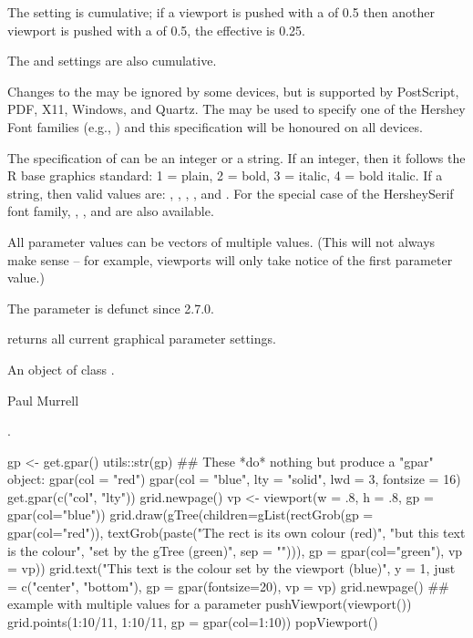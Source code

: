 \begin{Details}
The  setting is cumulative;  if a viewport is pushed
with a  of 0.5 then another viewport is pushed with a
 of 0.5, the effective  is 0.25.

The  and  settings are also cumulative.

Changes to the  may be ignored by some devices,
but is supported by PostScript, PDF, X11, Windows, and Quartz.  The
 may be used to specify one
of the Hershey Font families (e.g., )
and this specification will be honoured
on all devices.

The specification of  can be an integer or a string.
If an integer, then it
follows the R base graphics
standard:  1 = plain, 2 = bold, 3 = italic, 4 = bold italic.
If a string, then valid values are: ,
, , , and
.
For the special case of the HersheySerif font family,
, , and 
are also available.

All parameter values can be vectors of multiple values.  (This will
not always make sense -- for example, viewports will only take
notice of the first parameter value.)

The  parameter is defunct since \R{} 2.7.0.

 returns all current graphical parameter settings.
\end{Details}
%
\begin{Value}
An object of class .
\end{Value}
%
\begin{Author}\relax
Paul Murrell
\end{Author}
%
\begin{SeeAlso}\relax
{}.
\end{SeeAlso}
%
\begin{Examples}
\begin{ExampleCode}
gp <- get.gpar()
utils::str(gp)
## These *do* nothing but produce a "gpar" object:
gpar(col = "red")
gpar(col = "blue", lty = "solid", lwd = 3, fontsize = 16)
get.gpar(c("col", "lty"))
grid.newpage()
vp <- viewport(w = .8, h = .8, gp = gpar(col="blue"))
grid.draw(gTree(children=gList(rectGrob(gp = gpar(col="red")),
                     textGrob(paste("The rect is its own colour (red)",
                                    "but this text is the colour",
                                    "set by the gTree (green)",
                                    sep = "\n"))),
      gp = gpar(col="green"), vp = vp))
grid.text("This text is the colour set by the viewport (blue)",
          y = 1, just = c("center", "bottom"),
          gp = gpar(fontsize=20), vp = vp)
grid.newpage()
## example with multiple values for a parameter
pushViewport(viewport())
grid.points(1:10/11, 1:10/11, gp = gpar(col=1:10))
popViewport()
\end{ExampleCode}
\end{Examples}
